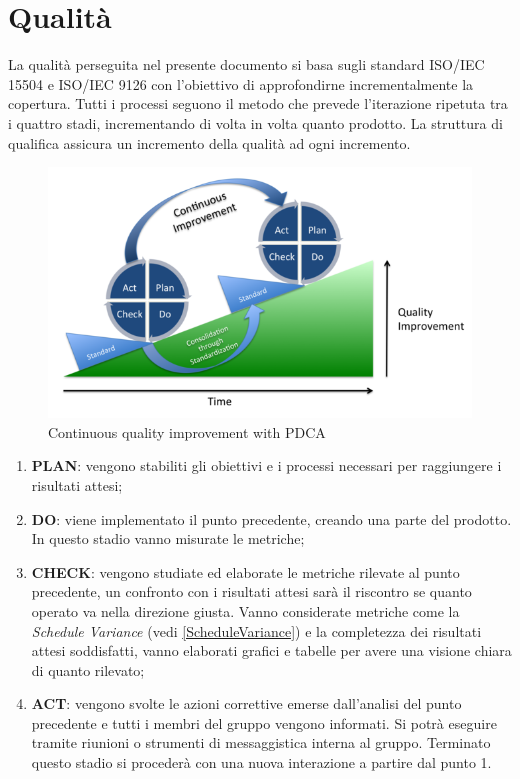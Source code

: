 \pagebreak
\section{Qualità}
La qualità perseguita nel presente documento si basa sugli standard ISO/IEC 15504  e ISO/IEC 9126 con l'obiettivo di approfondirne incrementalmente la copertura. Tutti i processi seguono il metodo  che prevede l'iterazione ripetuta tra i quattro stadi, incrementando di volta in volta quanto prodotto. La struttura di qualifica assicura un incremento della qualità ad ogni incremento. \\
	\begin{figure}[h]
	\centering \includegraphics[width=1\textwidth]{PDCA.png}
	\caption{Continuous quality improvement with PDCA}
	\end{figure}
	
	\begin{enumerate}
		\item \textbf{PLAN}: vengono stabiliti gli obiettivi e i processi necessari per raggiungere i risultati attesi;
		\item \textbf{DO}: viene implementato il punto precedente, creando una parte del prodotto. In questo stadio vanno misurate le metriche;
		\item \textbf{CHECK}: vengono studiate ed elaborate le metriche rilevate al punto precedente, un confronto con i risultati attesi sarà il riscontro se quanto operato va nella direzione giusta. Vanno considerate metriche come la \emph{Schedule Variance} (vedi \ref{ScheduleVariance}) e la completezza dei risultati attesi soddisfatti, vanno elaborati grafici e tabelle per avere una visione chiara di quanto rilevato;
		\item \textbf{ACT}: vengono svolte le azioni correttive emerse dall'analisi del punto precedente e tutti i membri del gruppo vengono informati. Si potrà eseguire tramite riunioni o strumenti di messaggistica interna al gruppo. Terminato questo stadio si procederà con una nuova interazione a partire dal punto 1.
	\end{enumerate}

